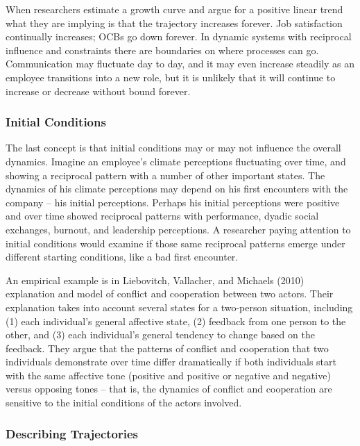 \documentclass[english,,man]{apa6}
\theoremstyle{definition}
\theoremstyle{definition}
\theoremstyle{definition}
\theoremstyle{remark}
\begin{document}
When researchers estimate a growth curve and argue for a positive linear
trend what they are implying is that the trajectory increases forever.
Job satisfaction continually increases; OCBs go down forever. In dynamic
systems with reciprocal influence and constraints there are boundaries
on where processes can go. Communication may fluctuate day to day, and
it may even increase steadily as an employee transitions into a new
role, but it is unlikely that it will continue to increase or decrease
without bound forever.

\hypertarget{initial-conditions}{%
\subsubsection{Initial Conditions}\label{initial-conditions}}

The last concept is that initial conditions may or may not influence the
overall dynamics. Imagine an employee's climate perceptions fluctuating
over time, and showing a reciprocal pattern with a number of other
important states. The dynamics of his climate perceptions may depend on
his first encounters with the company -- his initial perceptions.
Perhaps his initial perceptions were positive and over time showed
reciprocal patterns with performance, dyadic social exchanges, burnout,
and leadership perceptions. A researcher paying attention to initial
conditions would examine if those same reciprocal patterns emerge under
different starting conditions, like a bad first encounter.

An empirical example is in Liebovitch, Vallacher, and Michaels (2010)
explanation and model of conflict and cooperation between two actors.
Their explanation takes into account several states for a two-person
situation, including (1) each individual's general affective state, (2)
feedback from one person to the other, and (3) each individual's general
tendency to change based on the feedback. They argue that the patterns
of conflict and cooperation that two individuals demonstrate over time
differ dramatically if both individuals start with the same affective
tone (positive and positive or negative and negative) versus opposing
tones -- that is, the dynamics of conflict and cooperation are sensitive
to the initial conditions of the actors involved.

\hypertarget{describing-trajectories}{%
\subsubsection{Describing Trajectories}\label{describing-trajectories}}
\end{document}

